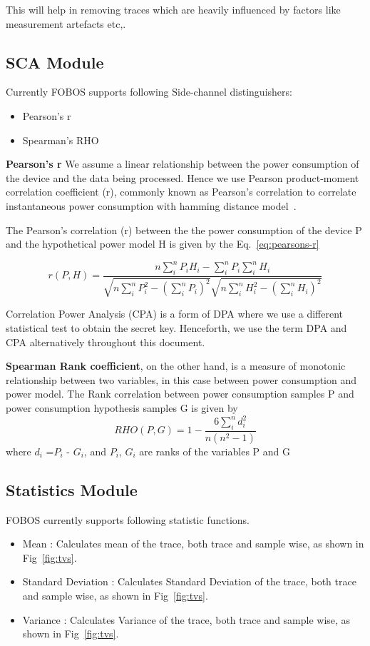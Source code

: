 \documentclass{llncs}
\numberwithin{algorithm}{chapter}
\begin{document}
This will help in removing traces which are heavily influenced by factors like measurement artefacts etc,.

\subsection{SCA Module}
Currently FOBOS supports following Side-channel distinguishers:
\begin{itemize}
\item Pearson's r
\item Spearman's RHO
\end{itemize}
\textbf{Pearson's r}
We assume a linear relationship between the power consumption of the device
and the data being processed. Hence we use Pearson product-moment correlation
coefficient (r), commonly known as Pearson's correlation to correlate instantaneous power
consumption with hamming distance model~\cite{1203}.

The Pearson's correlation (r) between the the power consumption of the device P and the
hypothetical power model H is given by the Eq.~\ref{eq:pearsons-r}

\begin{equation}\label{eq:pearsons-r}
r(P,H) =\frac{n \sum_{i}^{n}{P_iH_i}-\sum_{i}^{n} P_i\sum_{i}^{n}H_i}{\sqrt{n\sum_{i}^{n} 
	      P_i^2-(\sum_{i}^{n} P_i)^2}\sqrt {n\sum_{i}^{n} H_i^2-(\sum_{i}^{n} H_i)^2}}
\end{equation}   

Correlation Power Analysis (CPA) is a form of DPA where we use a different statistical test to obtain the secret key. Henceforth, we use
the term DPA and CPA alternatively throughout this document.

\textbf{Spearman Rank coefficient}, on the other hand, is a measure of monotonic relationship 
between two variables, in this case between power consumption and power model.
The Rank correlation between power consumption samples P and power consumption hypothesis samples G is given by
\begin{equation}
\label{pceqn}
RHO(P,G)=1-\frac{6\sum_{i}^{n}d_i^2}{n(n^2-1)}
\end{equation} 
where $d_i$ =$P_i$ - $G_i$, and $P_i$, $G_i$ are ranks of the variables P and G 

\subsection{Statistics Module}
FOBOS currently supports following statistic functions.
\begin{itemize}
\item Mean : Calculates mean of the trace, both trace and sample wise, as shown in Fig~\ref{fig:tvs}.
\item Standard Deviation : Calculates Standard Deviation of the trace, both trace and sample wise, as shown in Fig~\ref{fig:tvs}.
\item Variance : Calculates Variance of the trace, both trace and sample wise, as shown in Fig~\ref{fig:tvs}.
\end{itemize}
\end{document}
